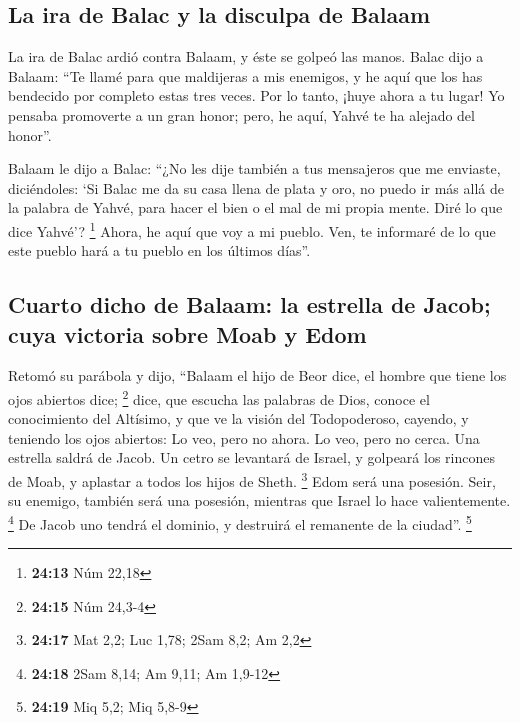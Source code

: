 \begin{paracol}{2}
\hypertarget{la-ira-de-balac-y-la-disculpa-de-balaam}{%
\subsection{La ira de Balac y la disculpa de
Balaam}\label{la-ira-de-balac-y-la-disculpa-de-balaam}}

 La ira de Balac ardió contra Balaam, y éste se golpeó
las manos. Balac dijo a Balaam: ``Te llamé para que maldijeras a mis
enemigos, y he aquí que los has bendecido por completo estas tres veces.
 Por lo tanto, ¡huye ahora a tu lugar! Yo pensaba
promoverte a un gran honor; pero, he aquí, Yahvé te ha alejado del
honor''.

 Balaam le dijo a Balac: ``¿No les dije también a tus
mensajeros que me enviaste, diciéndoles:  `Si Balac me da
su casa llena de plata y oro, no puedo ir más allá de la palabra de
Yahvé, para hacer el bien o el mal de mi propia mente. Diré lo que dice
Yahvé'? \footnote{\textbf{24:13} Núm 22,18}  Ahora, he
aquí que voy a mi pueblo. Ven, te informaré de lo que este pueblo hará a
tu pueblo en los últimos días''.

\hypertarget{cuarto-dicho-de-balaam-la-estrella-de-jacob-cuya-victoria-sobre-moab-y-edom}{%
\subsection{Cuarto dicho de Balaam: la estrella de Jacob; cuya victoria
sobre Moab y
Edom}\label{cuarto-dicho-de-balaam-la-estrella-de-jacob-cuya-victoria-sobre-moab-y-edom}}

 Retomó su parábola y dijo, ``Balaam el hijo de Beor
dice, el hombre que tiene los ojos abiertos dice; \footnote{\textbf{24:15}
  Núm 24,3-4}  dice, que escucha las palabras de Dios,
conoce el conocimiento del Altísimo, y que ve la visión del
Todopoderoso, cayendo, y teniendo los ojos abiertos:  Lo
veo, pero no ahora. Lo veo, pero no cerca. Una estrella saldrá de Jacob.
Un cetro se levantará de Israel, y golpeará los rincones de Moab, y
aplastar a todos los hijos de Sheth. \footnote{\textbf{24:17} Mat 2,2;
  Luc 1,78; 2Sam 8,2; Am 2,2}  Edom será una posesión.
Seir, su enemigo, también será una posesión, mientras que Israel lo hace
valientemente. \footnote{\textbf{24:18} 2Sam 8,14; Am 9,11; Am 1,9-12}
 De Jacob uno tendrá el dominio, y destruirá el remanente
de la ciudad''. \footnote{\textbf{24:19} Miq 5,2; Miq 5,8-9}


\end{paracol}
